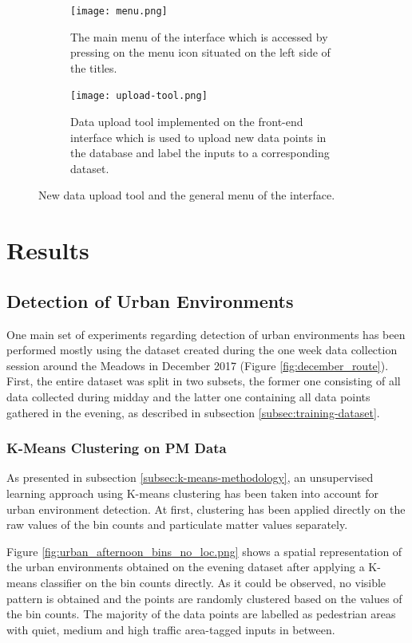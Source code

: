 \documentclass[bsc,frontabs,twoside,singlespacing, parskip,deptreport]{infthesis}     %
\begin{document}
\begin{figure}[h!]
  \begin{subfigure}[t]{\textwidth}
    \texttt{[image: menu.png]}
    \caption{The main menu of the interface which is accessed by pressing on the menu icon situated on the left side of the titles.}
    \label{fig:menu}
  \end{subfigure}
  \hfill
  \begin{subfigure}[t]{\textwidth}
    \texttt{[image: upload-tool.png]}
    \caption{Data upload tool implemented on the front-end interface which is used to upload new data points in the database and label the inputs to a corresponding dataset.}
    \label{fig:upload-tool}
  \end{subfigure}
  \caption{New data upload tool and the general menu of the interface.}
  \label{fig:upload-tool-and-menu}
\end{figure}


\chapter{Results}

\section{Detection of Urban Environments}

One main set of experiments regarding detection of urban environments has been performed mostly using the dataset created during the one week data collection session around the Meadows in December 2017 (Figure \ref{fig:december_route}). First, the entire dataset was split in two subsets, the former one consisting of all data collected during midday and the latter one containing all data points gathered in the evening, as described in subsection \ref{subsec:training-dataset}.

\subsection{K-Means Clustering on PM Data}

As presented in subsection \ref{subsec:k-means-methodology}, an unsupervised learning approach using K-means clustering has been taken into account for urban environment detection. At first, clustering has been applied directly on the raw values of the bin counts and particulate matter values separately.

Figure \ref{fig:urban_afternoon_bins_no_loc.png} shows a spatial representation of the urban environments obtained on the evening dataset after applying a K-means classifier on the bin counts directly. As it could be observed, no visible pattern is obtained and the points are randomly clustered based on the values of the bin counts. The majority of the data points are labelled as pedestrian areas with quiet,  medium and high traffic area-tagged inputs in between.
\end{document}

